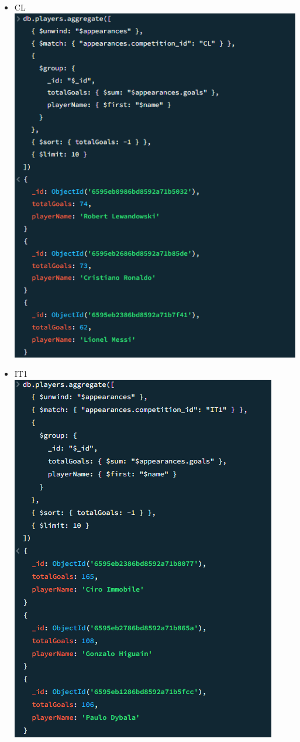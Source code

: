 \documentclass{Configuration_Files/PoliMi3i_thesis}
\begin{document}
\begin{itemize}
    \item CL\\
        \includegraphics[scale=0.8]{Images/Queries/Competitions_statistics/top_goalscorers/CL.png}
    \item IT1\\
    \includegraphics[scale=0.8]{Images/Queries/Competitions_statistics/top_goalscorers/IT1.png}

\end{itemize}
\end{document}
